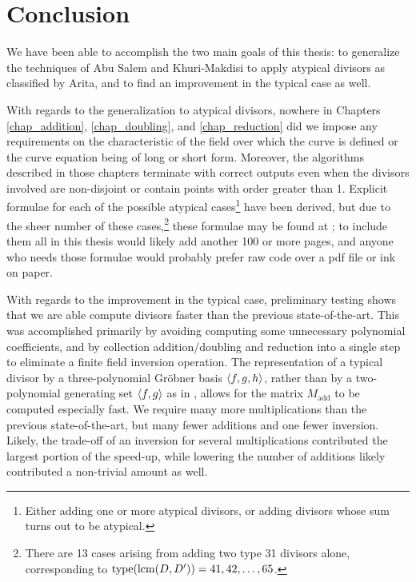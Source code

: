 
\section{Conclusion}
\label{chap_conclusion}

We have been able to accomplish the two main goals of this thesis:
to generalize the techniques of Abu Salem and Khuri-Makdisi to apply atypical divisors as classified by Arita,
and to find an improvement in the typical case as well.

With regards to the generalization to atypical divisors,
nowhere in Chapters \ref{chap_addition}, \ref{chap_doubling}, and \ref{chap_reduction}
did we impose any requirements on the characteristic of the field over which the curve is defined
or the curve equation being of long or short form.
Moreover, the algorithms described in those chapters terminate with correct outputs
even when the divisors involved are non-disjoint or contain points with order greater than 1.
Explicit formulae for each of the possible atypical cases\footnote{
Either adding one or more atypical divisors, or adding divisors whose sum turns out to be atypical.}
have been derived, but due to the sheer number of these cases,\footnote{
There are 13 cases arising from adding two type 31 divisors alone,
corresponding to $\operatorname{type}(\operatorname{lcm}(D, D')) = 41, 42, \ldots, 65$.}
these formulae may be found at \cite{github};
to include them all in this thesis would likely add another 100 or more pages,
and anyone who needs those formulae would probably prefer raw code over a pdf file or ink on paper.

With regards to the improvement in the typical case,
preliminary testing shows that we are able compute divisors faster than the previous state-of-the-art.
This was accomplished primarily by avoiding computing some unnecessary polynomial coefficients,
and by collection addition/doubling and reduction into a single step to eliminate a finite field inversion operation.
The representation of a typical divisor by a three-polynomial Gr\"obner basis $\left\langle f,g,h \right\rangle$,
rather than by a two-polynomial generating set $\left\langle f,g \right\rangle$ as in \cite{salem07},
allows for the matrix $M_{\text{add}}$ to be computed especially fast.
We require many more multiplications than the previous state-of-the-art,
but many fewer additions and one fewer inversion.
Likely, the trade-off of an inversion for several multiplications contributed the largest portion of the speed-up,
while lowering the number of additions likely contributed a non-trivial amount as well.

